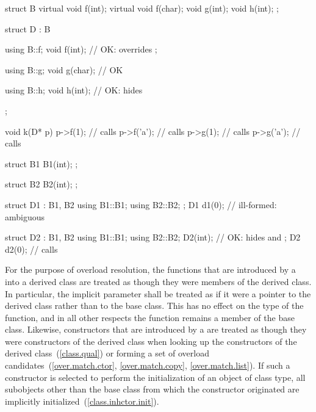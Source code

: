 \begin{codeblock}
struct B {
  virtual void f(int);
  virtual void f(char);
  void g(int);
  void h(int);
};

struct D : B {
  using B::f;
  void f(int);      // OK:  overrides ;

  using B::g;
  void g(char);     // OK

  using B::h;
  void h(int);      // OK:  hides 
};

void k(D* p)
{
  p->f(1);          // calls 
  p->f('a');        // calls 
  p->g(1);          // calls 
  p->g('a');        // calls 
}

struct B1 {
  B1(int);
};

struct B2 {
  B2(int);
};

struct D1 : B1, B2 {
  using B1::B1;
  using B2::B2;
};
D1 d1(0);    // ill-formed: ambiguous

struct D2 : B1, B2 {
  using B1::B1;
  using B2::B2;
  D2(int);   // OK:  hides  and 
};
D2 d2(0);    // calls 
\end{codeblock}
\exitexample

\pnum
{}%
For the purpose of overload resolution, the functions that are
introduced by a  into a derived class
are treated as though they were members of the derived class. In
particular, the implicit  parameter shall be treated as if
it were a pointer to the derived class rather than to the base class.
This has no effect on the type of the function, and in all other
respects the function remains a member of the base class.
Likewise, constructors that are introduced by a 
are treated as though they were constructors of the derived class
when looking up the constructors of the derived class~(\ref{class.qual})
or forming a set of overload candidates~(\ref{over.match.ctor}, \ref{over.match.copy}, \ref{over.match.list}).
If such a constructor is selected to perform the initialization
of an object of class type, all subobjects other than the base class
from which the constructor originated
are implicitly initialized~(\ref{class.inhctor.init}).

